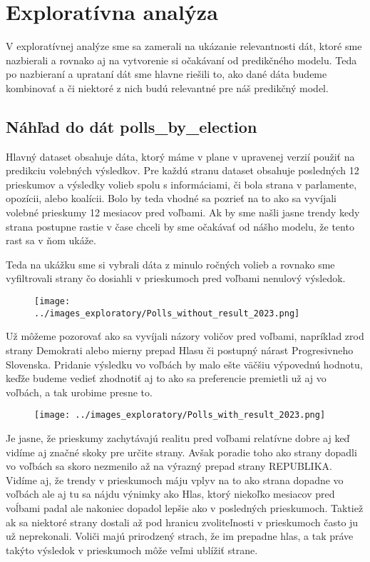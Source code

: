 \documentclass[main.tex]{subfiles}
\begin{document}
\section{Exploratívna analýza}
V exploratívnej analýze sme sa zamerali na ukázanie relevantnosti dát, ktoré sme nazbierali a rovnako aj na vytvorenie si očakávaní od predikčného modelu. Teda po nazbieraní a uprataní dát sme hlavne riešili to, ako dané dáta budeme kombinovať a či niektoré z nich budú relevantné pre náš predikčný model.

\subsection{Náhľad do dát polls_by_election}
Hlavný dataset obsahuje dáta, ktorý máme v plane v upravenej verzií použiť na predikciu volebných výsledkov. Pre každú stranu dataset obsahuje posledných 12 prieskumov a výsledky volieb spolu s informáciami, či bola strana v parlamente, opozícii, alebo koalícii. Bolo by teda vhodné sa pozrieť na to ako sa vyvíjali volebné prieskumy 12 mesiacov pred voľbami. Ak by sme našli jasne trendy kedy strana postupne rastie v čase chceli by sme očakávať od nášho modelu, že tento rast sa v ňom ukáže. 

Teda na ukážku sme si vybrali dáta z minulo ročných volieb a rovnako sme vyfiltrovali strany čo dosiahli v prieskumoch pred voľbami nenulový výsledok. 
\begin{figure}[!htbp]
    \centering
    \texttt{[image: ../images\_exploratory/Polls\_without\_result\_2023.png]}
    \caption{}
    \label{fig:example}
\end{figure}

Už môžeme pozorovať ako sa vyvíjali názory voličov pred voľbami, napríklad zrod strany Demokrati alebo mierny prepad Hlasu či postupný nárast Progresivneho Slovenska.
Pridanie výsledku vo voľbách by malo ešte väčšiu výpovednú hodnotu, keďže budeme vedieť zhodnotiť aj to ako sa preferencie premietli už aj vo voľbách, a tak urobime presne to.
\begin{figure}[!htbp]
    \centering
    \texttt{[image: ../images\_exploratory/Polls\_with\_result\_2023.png]}
    \caption{}
    \label{fig:example}
\end{figure}

Je jasne, že prieskumy zachytávajú realitu pred voľbami relatívne dobre aj keď vidíme aj značné skoky pre určite strany. Avšak poradie toho ako strany dopadli vo voľbách sa skoro nezmenilo až na výrazný prepad strany REPUBLIKA.
Vidíme aj, že trendy v prieskumoch máju vplyv na to ako strana dopadne vo voľbách ale aj tu sa nájdu výnimky ako Hlas, ktorý niekoľko mesiacov pred voĺbami padal ale nakoniec dopadol lepšie ako v posledných prieskumoch. Taktiež ak sa niektoré strany dostali až pod hranicu zvoliteľnosti v prieskumoch často ju už neprekonali. Voliči majú prirodzený strach, že im prepadne hlas, a tak práve takýto výsledok v prieskumoch môže veľmi ublížiť strane.
\end{document}
